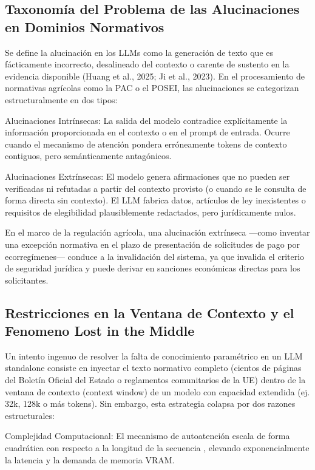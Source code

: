 \subsection{Taxonomía del Problema de las Alucinaciones en Dominios Normativos}
Se define la alucinación en los LLMs como la generación de texto que es fácticamente incorrecto, desalineado del contexto o carente de sustento en la evidencia disponible (Huang et al., 2025; Ji et al., 2023). En el procesamiento de normativas agrícolas como la PAC o el POSEI, las alucinaciones se categorizan estructuralmente en dos tipos:

Alucinaciones Intrínsecas: La salida del modelo contradice explícitamente la información proporcionada en el contexto o en el prompt de entrada. Ocurre cuando el mecanismo de atención pondera erróneamente tokens de contexto contiguos, pero semánticamente antagónicos.

Alucinaciones Extrínsecas: El modelo genera afirmaciones que no pueden ser verificadas ni refutadas a partir del contexto provisto (o cuando se le consulta de forma directa sin contexto). El LLM fabrica datos, artículos de ley inexistentes o requisitos de elegibilidad plausiblemente redactados, pero jurídicamente nulos.

En el marco de la regulación agrícola, una alucinación extrínseca ---como inventar una excepción normativa en el plazo de presentación de solicitudes de pago por ecorregímenes--- conduce a la invalidación del sistema, ya que invalida el criterio de seguridad jurídica y puede derivar en sanciones económicas directas para los solicitantes.

\subsection{Restricciones en la Ventana de Contexto y el Fenomeno Lost in the Middle}
Un intento ingenuo de resolver la falta de conocimiento paramétrico en un LLM standalone consiste en inyectar el texto normativo completo (cientos de páginas del Boletín Oficial del Estado o reglamentos comunitarios de la UE) dentro de la ventana de contexto (context window) de un modelo con capacidad extendida (ej. 32k, 128k o más tokens). Sin embargo, esta estrategia colapsa por dos razones estructurales:

Complejidad Computacional: El mecanismo de autoatención  escala de forma cuadrática  con respecto a la longitud de la secuencia , elevando exponencialmente la latencia y la demanda de memoria VRAM.

